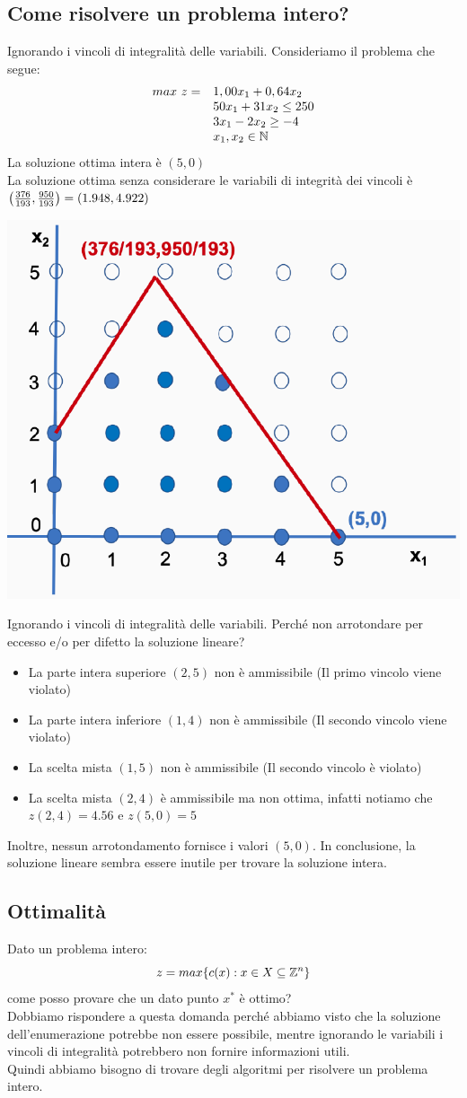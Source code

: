 \documentclass[12pt,a4paper]{article}
\begin{document}
\subsection{Come risolvere un problema intero?}
Ignorando i vincoli di integralità delle variabili. Consideriamo il problema che segue:
$$\begin{array}{rl}
max \ z = & 1,00 x_1 + 0,64 x_2\\
& 50 x_1 + 31 x_2 \leq 250\\
& 3 x_1 - 2x_2 \geq -4\\
& x_1,x_2  \in \mathbb{N}
\end{array}$$
La soluzione ottima intera è $(5,0)$\\
La soluzione ottima senza considerare le variabili di integrità dei vincoli è $\left({376\over193},{950\over193}\right)=(1.948,4.922)$
\begin{center}
\includegraphics[width=0.4\columnwidth]{img/ip1.png}
\end{center}
Ignorando i vincoli di integralità delle variabili. Perché non arrotondare per eccesso e/o per difetto la soluzione lineare?
\begin{itemize}
\item La parte intera superiore $(2,5)$ non è ammissibile (Il primo vincolo viene violato)
\item La parte intera inferiore $(1,4)$ non è ammissibile (Il secondo vincolo viene violato)
\item La scelta mista $(1,5)$ non è ammissibile (Il secondo vincolo è violato)
\item La scelta mista $(2,4)$ è ammissibile ma non ottima, infatti notiamo che $z(2,4)=4.56$ e $z(5,0)=5$
\end{itemize}
Inoltre, nessun arrotondamento fornisce i valori $(5,0)$.
In conclusione, la soluzione lineare sembra essere inutile per trovare la soluzione intera.

\subsection{Ottimalità}
Dato un problema intero: $$z=max\{c(x):x\in X \subseteq \mathbb{Z}^n\}$$ come posso provare che un dato punto $x^*$ è ottimo?\\
Dobbiamo rispondere a questa domanda perché abbiamo visto che la soluzione dell'enumerazione potrebbe non essere possibile, mentre ignorando le variabili i vincoli di integralità potrebbero non fornire informazioni utili.\\
Quindi abbiamo bisogno di trovare degli algoritmi per risolvere un problema intero.
\end{document}
